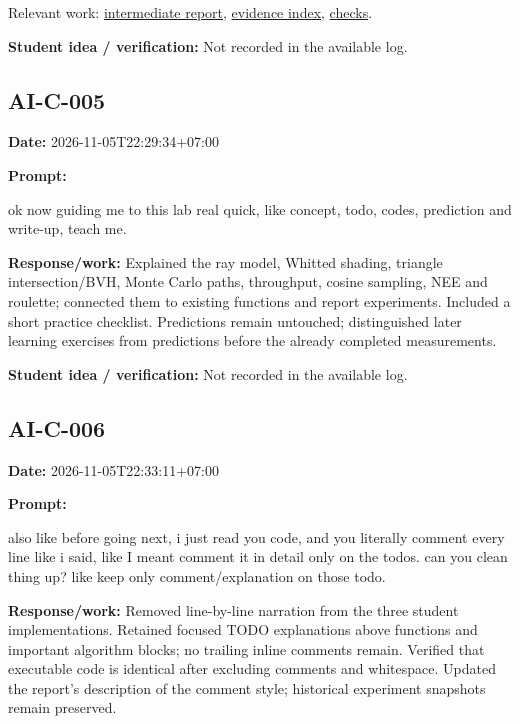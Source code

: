 \documentclass[11pt,a4paper]{article}
\begin{document}
Relevant work: \href{https://github.com/Champy2005/Lab09-RayTracing/blob/main/docs/report/intermediate-report.md}{intermediate report}, \href{https://github.com/Champy2005/Lab09-RayTracing/blob/main/evidence/README.md}{evidence index}, \href{https://github.com/Champy2005/Lab09-RayTracing/blob/main/evidence/terminal/verification.txt}{checks}.\par
\noindent\textbf{Student idea / verification:} Not recorded in the available log.\par\medskip
{}\subsection*{AI-C-005}
\noindent\textbf{Date:} 2026-11-05T22:29:34+07:00\par
\noindent\textbf{Prompt:}
\begin{prompt}
ok now guiding me to this lab real quick, like concept, todo, codes, prediction and
write-up, teach me.
\end{prompt}
\noindent\textbf{Response/work:} Explained the ray model, Whitted shading, triangle intersection/\allowbreak{}BVH, Monte Carlo paths, throughput, cosine sampling, NEE and roulette; connected them to existing functions and report experiments. Included a short practice checklist. Predictions remain untouched; distinguished later learning exercises from predictions before the already completed measurements.\par
\noindent\textbf{Student idea / verification:} Not recorded in the available log.\par\medskip
{}\subsection*{AI-C-006}
\noindent\textbf{Date:} 2026-11-05T22:33:11+07:00\par
\noindent\textbf{Prompt:}
\begin{prompt}
also like before going next, i just read you code, and you literally comment every line
like i said, like I meant comment it in detail only on the todos. can you clean thing up?
 like keep only comment/explanation on those todo.
\end{prompt}
\noindent\textbf{Response/work:} Removed line-by-line narration from the three student implementations. Retained focused TODO explanations above functions and important algorithm blocks; no trailing inline comments remain. Verified that executable code is identical after excluding comments and whitespace. Updated the report's description of the comment style; historical experiment snapshots remain preserved.\par
\end{document}
